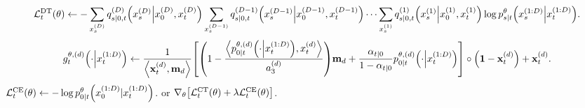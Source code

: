 \documentclass[10pt]{article}
\begin{document}
\begin{algorithm}
\begin{algorithmic}
    \EndFor
    \State
    {\color{red}
    \begin{eqnarray*}
      \mathcal{L}^\text{DT}_t(\theta)\gets - \sum_{x_s^{(D)}}q^{(D)}_{s|0,t}\qty(x_s^{(D)}\middle|x_0^{(D)}, x_t^{(D)})\sum_{x_s^{(D-1)}}q^{(D-1)}_{s|0,t}\qty(x_s^{(D-1)}\middle|x_0^{(D-1)}, x_t^{(D-1)})\cdots\sum_{x_s^{(1)}} q^{(1)}_{s|0,t}\qty(x_s^{(1)}\middle|x_0^{(1)}, x_t^{(1)})\log p^\theta_{s|t}\qty(x_s^{(1:D)}\middle|x_t^{(1:D)}).
    \end{eqnarray*}
    }
    \State
    {\color{blue}
    \begin{eqnarray*}
      g^{\theta,(d)}_t\qty(\cdot\middle|x^{(1:D)}_t)\gets \frac{1}{\left\langle \mathbf{x}^{(d)}_t,\mathbf{m}_d\right\rangle}\qty[\qty(1-\frac{\left\langle p^{\theta,(d)}_{0|t}\qty(\cdot\middle|x^{(1:D)}_t),x^{(d)}_t\right\rangle}{a^{(d)}_3})\mathbf{m}_d + \frac{\alpha_{t|0}}{1-\alpha_{t|0}}p^{\theta,(d)}_{0|t}\qty(\cdot\middle|x^{(1:D)}_t)]\circ \qty(\mathbf{1}-\mathbf{x}^{(d)}_t) + \mathbf{x}^{(d)}_t.
    \end{eqnarray*}
    }
    \State $\mathcal{L}^\text{CE}_t(\theta)\gets -\log p^\theta_{0|t}\qty(x^{(1:D)}_0|x^{(1:D)}_t)$.
     or {\color{blue} $\nabla_\theta\qty[\mathcal{L}^\text{CT}_t(\theta) + \lambda \mathcal{L}^\text{CE}_t(\theta)]$}.
  \end{algorithmic}
\end{algorithm}
\end{document}
